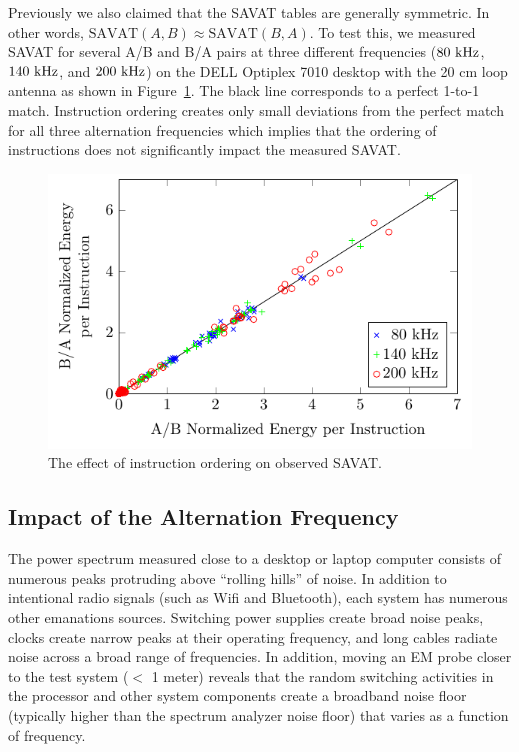 Previously we also claimed that the SAVAT tables are generally symmetric. In other words, $\textrm{SAVAT}(A,B) \approx \textrm{SAVAT}(B,A)$. To test this, we measured SAVAT for several A/B and B/A pairs at three different frequencies ($80~{\rm kHz}$, $140~{\rm kHz}$, and $200~{\rm kHz}$) on the DELL Optiplex 7010 desktop with the 20 cm loop antenna as shown in Figure~\ref{fig:Order}. The black line corresponds to a perfect 1-to-1 match. Instruction ordering creates only small deviations from the perfect match for all three alternation frequencies which implies that the ordering of instructions does not significantly impact the measured SAVAT.
\begin{figure}[htb]
	\centering
	\includegraphics[width=5in]{../TEMC_SAVAT/figures/ab_vs_ba.pdf}
	\caption{ The effect of instruction ordering on observed SAVAT.\label{fig:Order}}
\end{figure}

\subsection{Impact of the Alternation Frequency}\label{sec:freq}

The power spectrum measured close to a desktop or laptop computer consists of numerous peaks protruding above ``rolling hills'' of noise. In addition to intentional radio signals (such as Wifi and Bluetooth), each system has numerous other emanations sources. Switching power supplies create broad noise peaks, clocks create narrow peaks at their operating frequency, and long cables radiate noise across a broad range of frequencies. In addition, moving an EM probe closer to the test system ($<$ 1 meter) reveals that the random switching activities in the processor and other system components create a broadband noise floor (typically higher than the spectrum analyzer noise floor) that varies as a function of frequency.

